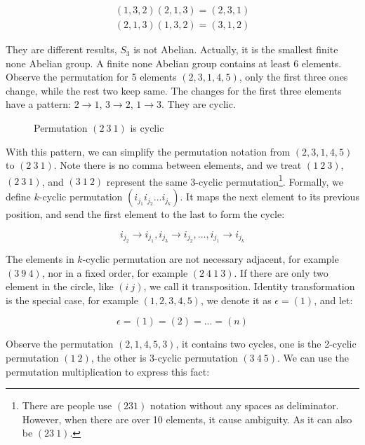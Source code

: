\documentclass{article}
\begin{document}
\[
\begin{array}{l}
(1, 3, 2) (2, 1, 3) = (2, 3, 1) \\
(2, 1, 3) (1, 3, 2) = (3, 1, 2)
\end{array}
\]

They are different results, $S_3$ is not Abelian. Actually, it is the smallest finite none Abelian group. A finite none Abelian group contains at least 6 elements. Observe the permutation for 5 elements $(2, 3, 1, 4, 5)$, only the first three ones change, while the rest two keep same. The changes for the first three elements have a pattern: $2 \to 1$, $3 \to 2$, $1 \to 3$. They are cyclic.

\begin{figure}[htbp]
\centering
{}
\caption{Permutation $(2\ 3\ 1)$ is cyclic}
\label{fig:cycle-permutation}
\end{figure}

With this pattern, we can simplify the permutation notation from $(2, 3, 1, 4, 5)$ to $(2\ 3\ 1)$. Note there is no comma between elements, and we treat $(1\ 2\ 3)$, $(2\ 3\ 1)$, and $(3\ 1\ 2)$ represent the same 3-cyclic permutation\footnote{There are people use $(231)$ notation without any spaces as deliminator. However, when there are over 10 elements, it cause ambiguity. As it can also be $(23\ 1)$.}. Formally, we define $k$-cyclic permutation $(i_{j_1} i_{j_2} ... i_{j_k})$. It maps the next element to its previous position, and send the first element to the last to form the cycle:

\[
i_{j_2} \to i_{j_1}, i_{j_3} \to i_{j_2}, ..., i_{j_1} \to i_{j_k}
\]

The elements in $k$-cyclic permutation are not necessary adjacent, for example $(3\ 9\ 4)$, nor in a fixed order, for example $(2\ 4\ 1\ 3)$. If there are only two element in the circle, like $(i\ j)$, we call it transposition. Identity transformation is the special case, for example $(1, 2, 3, 4, 5)$, we denote it as $\epsilon = (1)$, and let:

\[
\epsilon = (1) = (2) = ... = (n)
\]

Observe the permutation $(2, 1, 4, 5, 3)$, it contains two cycles, one is the 2-cyclic permutation $(1\ 2)$, the other is 3-cyclic permutation $(3\ 4\ 5)$. We can use the permutation multiplication to express this fact:
\end{document}

